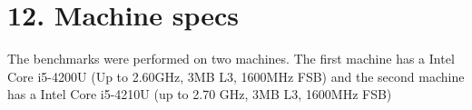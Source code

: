 \section*{12. Machine specs}
The benchmarks were performed on two machines. The first machine has a Intel Core i5-4200U (Up to 2.60GHz, 3MB L3, 1600MHz FSB) and the second machine has a Intel Core i5-4210U (up to 2.70 GHz, 3MB L3, 1600MHz FSB)